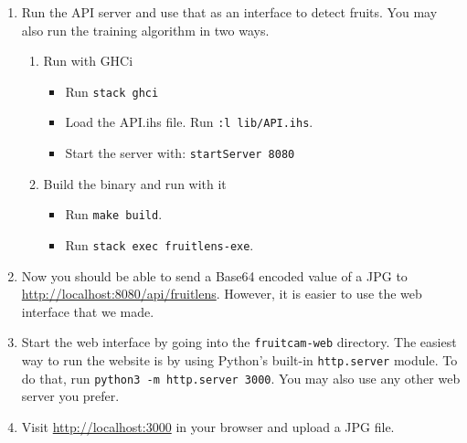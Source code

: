 \begin{enumerate}
  \item Run the API server and use that as an interface to detect fruits. You may also run the training algorithm in two ways. 
  \begin{enumerate}
      \item Run with GHCi
        \begin{itemize}
            \item Run \verb |stack ghci|
            \item Load the API.ihs file. Run \verb|:l lib/API.ihs|.
            \item Start the server with: \verb|startServer 8080|
        \end{itemize}
      \item Build the binary and run with it
        \begin{itemize}
            \item Run \verb|make build|.
            \item Run \verb|stack exec fruitlens-exe|.
        \end{itemize}
  \end{enumerate}
    \item Now you should be able to send a Base64 encoded value of a JPG to \url{http://localhost:8080/api/fruitlens}. However, it is easier to use the web interface that we made.
    \item Start the web interface by going into the \texttt{fruitcam-web} directory. The easiest way to run the website is by using Python's built-in \texttt{http.server} module. To do that, run \verb|python3 -m http.server 3000|. You may also use any other web server you prefer. 
    \item Visit \url{http://localhost:3000} in your browser and upload a JPG file.
\end{enumerate}
